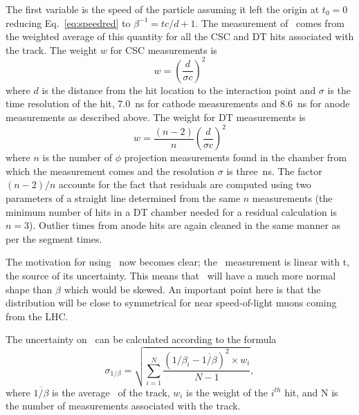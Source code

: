 The first variable is the speed of the particle assuming it left the origin at $t_0 = 0$ reducing Eq.~\ref{eq:speedred} to 
$\beta^{-1} = tc/d + 1$. The measurement of \invbeta\ comes from the weighted average of this quantity for all the
CSC and DT hits associated with the track.
The weight $w$ for CSC measurements is
\begin{equation}
w = \left(\frac{d}{\sigma c}\right)^2
 \label{betaweight}
\end{equation}
where $d$ is the distance from the hit location to the interaction point
and $\sigma$ is the time resolution of the hit, 7.0~ns for cathode measurements and 8.6~ns for anode measurements as described above.
The weight for DT measurements is 
\begin{equation}
 w = \frac{(n-2)}{n}\left(\frac{d}{\sigma c}\right)^2
\end{equation}
where $n$ is the number of $\phi$ projection measurements found in the
chamber from which the measurement comes and the resolution $\sigma$ is three~ns.
The factor ${(n-2)/n}$ accounts for the fact that residuals are computed
using two parameters of a straight line determined from the same
$n$ measurements (the minimum number of hits in a DT chamber
needed for a residual calculation is $n=3$).
Outlier times from anode hits are again cleaned in the same manner as per the segment times. 

The motivation for using \invbeta\ now becomes clear; the \invbeta\ measurement
is linear with t, the source of its uncertainty. This means that \invbeta\ will have a much more normal shape than $\beta$ which would be skewed.
An important point here is that the distribution will be close to symmetrical for near speed-of-light muons coming from the LHC.

The uncertainty on \invbeta\ can be calculated according to the formula
\begin{equation}
 \sigma_{1/\beta} = \sqrt{\sum_{i=1}^N \frac{(1/\beta_i - \overline{1/\beta})^2 \times w_{i}}{N-1}},
 \label{betaerr}
\end{equation}
where $\overline{1/\beta}$ is the average \invbeta\ of the track, $w_{i}$ is the weight of the $i^{th}$ hit, and N is the number of measurements associated with the track.

